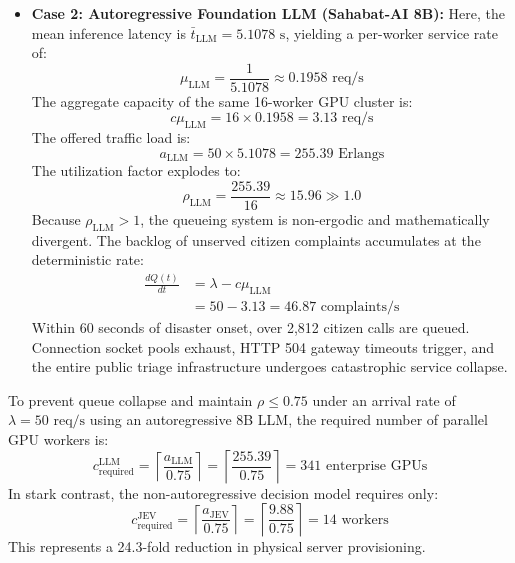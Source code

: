\documentclass[journal,compsoc]{IEEEtran}
\begin{document}
\begin{itemize}
    \item \textbf{Case 2: Autoregressive Foundation LLM (Sahabat-AI 8B):}
    Here, the mean inference latency is $\bar{t}_{\text{LLM}} = 5.1078 \text{ s}$, yielding a per-worker service rate of:
    \begin{equation}
    \mu_{\text{LLM}} = \frac{1}{5.1078} \approx 0.1958 \text{ req/s}
    \end{equation}
    The aggregate capacity of the same 16-worker GPU cluster is:
    \begin{equation}
    c \mu_{\text{LLM}} = 16 \times 0.1958 = 3.13 \text{ req/s}
    \end{equation}
    The offered traffic load is:
    \begin{equation}
    a_{\text{LLM}} = 50 \times 5.1078 = 255.39 \text{ Erlangs}
    \end{equation}
    The utilization factor explodes to:
    \begin{equation}
    \rho_{\text{LLM}} = \frac{255.39}{16} \approx 15.96 \gg 1.0
    \end{equation}
    Because $\rho_{\text{LLM}} > 1$, the queueing system is non-ergodic and mathematically divergent. The backlog of unserved citizen complaints accumulates at the deterministic rate:
    \begin{equation}
    \begin{aligned}
    \frac{d Q(t)}{dt} &= \lambda - c \mu_{\text{LLM}} \\
    &= 50 - 3.13 = 46.87 \text{ complaints/s}
    \end{aligned}
    \end{equation}
    Within 60 seconds of disaster onset, over 2,812 citizen calls are queued. Connection socket pools exhaust, HTTP 504 gateway timeouts trigger, and the entire public triage infrastructure undergoes catastrophic service collapse.
\end{itemize}

To prevent queue collapse and maintain $\rho \le 0.75$ under an arrival rate of $\lambda = 50 \text{ req/s}$ using an autoregressive 8B LLM, the required number of parallel GPU workers is:
\begin{equation}
c_{\text{required}}^{\text{LLM}} = \left\lceil \frac{a_{\text{LLM}}}{0.75} \right\rceil = \left\lceil \frac{255.39}{0.75} \right\rceil = 341 \text{ enterprise GPUs}
\end{equation}
In stark contrast, the non-autoregressive decision model requires only:
\begin{equation}
c_{\text{required}}^{\text{JEV}} = \left\lceil \frac{a_{\text{JEV}}}{0.75} \right\rceil = \left\lceil \frac{9.88}{0.75} \right\rceil = 14 \text{ workers}
\end{equation}
This represents a 24.3-fold reduction in physical server provisioning.
\end{document}
